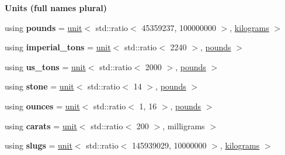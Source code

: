 \begin{Indent}{\bf Units (full names plural)}
\begin{DoxyCompactItemize}
\item 
\hypertarget{namespaceunits_1_1mass_acb74825d4784e3d5e8bb8f14611af36b}{}using {\bfseries pounds} = \hyperlink{structunits_1_1unit}{unit}$<$ std\+::ratio$<$ 45359237, 100000000 $>$, \hyperlink{structunits_1_1unit}{kilograms} $>$\label{namespaceunits_1_1mass_acb74825d4784e3d5e8bb8f14611af36b}

\item 
\hypertarget{namespaceunits_1_1mass_a5e6bba1e3191106f95cbfbe8be7ce773}{}using {\bfseries imperial\+\_\+tons} = \hyperlink{structunits_1_1unit}{unit}$<$ std\+::ratio$<$ 2240 $>$, \hyperlink{structunits_1_1unit}{pounds} $>$\label{namespaceunits_1_1mass_a5e6bba1e3191106f95cbfbe8be7ce773}

\item 
\hypertarget{namespaceunits_1_1mass_a4b63d2be0b766b7ee7e962a3ad3865ad}{}using {\bfseries us\+\_\+tons} = \hyperlink{structunits_1_1unit}{unit}$<$ std\+::ratio$<$ 2000 $>$, \hyperlink{structunits_1_1unit}{pounds} $>$\label{namespaceunits_1_1mass_a4b63d2be0b766b7ee7e962a3ad3865ad}

\item 
\hypertarget{namespaceunits_1_1mass_ab113ff616f4475ae249026692e0e49bc}{}using {\bfseries stone} = \hyperlink{structunits_1_1unit}{unit}$<$ std\+::ratio$<$ 14 $>$, \hyperlink{structunits_1_1unit}{pounds} $>$\label{namespaceunits_1_1mass_ab113ff616f4475ae249026692e0e49bc}

\item 
\hypertarget{namespaceunits_1_1mass_a4f0a00c632cb2355c7abaa740caddc1b}{}using {\bfseries ounces} = \hyperlink{structunits_1_1unit}{unit}$<$ std\+::ratio$<$ 1, 16 $>$, \hyperlink{structunits_1_1unit}{pounds} $>$\label{namespaceunits_1_1mass_a4f0a00c632cb2355c7abaa740caddc1b}

\item 
\hypertarget{namespaceunits_1_1mass_af404353f69c955a1460574749fee9a39}{}using {\bfseries carats} = \hyperlink{structunits_1_1unit}{unit}$<$ std\+::ratio$<$ 200 $>$, milligrams $>$\label{namespaceunits_1_1mass_af404353f69c955a1460574749fee9a39}

\item 
\hypertarget{namespaceunits_1_1mass_a8dfafdc7384c8d81fc5885599532dc69}{}using {\bfseries slugs} = \hyperlink{structunits_1_1unit}{unit}$<$ std\+::ratio$<$ 145939029, 10000000 $>$, \hyperlink{structunits_1_1unit}{kilograms} $>$\label{namespaceunits_1_1mass_a8dfafdc7384c8d81fc5885599532dc69}

\end{DoxyCompactItemize}
\end{Indent}
